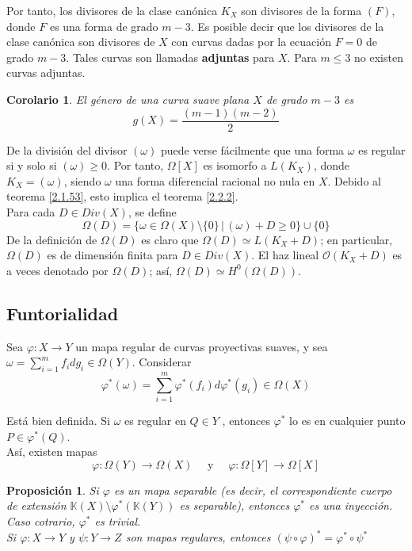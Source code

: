 \documentclass[12pt,a4paper]{report}
\newcommand{\Ou}{\mathscr{O}}
\newcommand{\K}{\mathbb{K}}
\newcommand{\ds}{\displaystyle}
\newtheorem{cor}{Corolario}[chapter]
\newtheorem{prop}{Proposición}[chapter]
\begin{document}
Por tanto, los divisores de la clase canónica $K_{X}$ son divisores de la forma $(F)$, donde $F$ es una forma de grado $m-3$. Es posible decir que los divisores de la clase canónica son divisores de $X$ con curvas dadas por la ecuación $F=0$ de grado $m-3$. Tales curvas son llamadas \textbf{adjuntas} para $X$. Para $m \leq 3$ no existen curvas adjuntas.

\begin{cor}
	El género de una curva suave plana $X$ de grado $m-3$ es $$g(X) = \frac{(m-1)(m-2)}{2}$$
\end{cor}

De la división del divisor $(\omega )$ puede verse fácilmente que una forma $\omega $ es regular si y solo si $(\omega) \geqslant 0$. Por tanto, $\Omega [X]$ es isomorfo a $L (K_{X})$, donde $K_{X}=(\omega)$, siendo $\omega$ una forma diferencial racional no nula en $X$. Debido al teorema \ref{2.1.53}, esto implica el teorema \ref{2.2.2}. \\

Para cada $D \in Div(X)$, se define $$\Omega (D)= \{ \omega \in \Omega (X) \setminus \{0 \} \, | \, (\omega) +D \geqslant 0\} \cup \{0\} $$ 
De la definición de $\Omega (D)$ es claro que $\Omega(D)\simeq L(K_{X}+D) $; en particular, $\Omega (D)$ es de dimensión finita para $D \in Div (X)$. El haz lineal $\Ou(K_{X}+D)$ es a veces denotado por $\Omega(D)$; así, $\Omega (D)  \simeq H^{0}(\Omega (D))$.


\subsection{Funtorialidad}
Sea $\varphi:X \rightarrow Y$ un mapa regular de curvas proyectivas suaves, y sea $\omega = \ds \sum_{i=1}^{m}f_{i}dg_{i}\in \Omega(Y)$. Considerar $$\varphi^{*}(\omega) = \sum_{i=1}^{m}\varphi^{*}(f_{i})d\varphi^{*}(g_{i})\in \Omega(X)$$

Está bien definida. Si $\omega$ es regular en $Q\in Y$ , entonces $\varphi^{*}$ lo es en cualquier punto $P \in \varphi^{*}(Q)$.\\

Así, existen mapas $$\varphi : \Omega (Y) \rightarrow \Omega(X) \quad \mbox{ y } \quad \varphi : \Omega [Y] \rightarrow \Omega[X]  $$

\begin{prop}
	Si $\varphi$ es un mapa separable (es decir, el correspondiente cuerpo de extensión $\K(X)\setminus \varphi^{*} (\K(Y)) $ es separable), entonces $\varphi^{*}$ es una inyección. Caso cotrario, $\varphi^{*}$ es trivial.\\
	Si $\varphi: X \rightarrow Y$ y $\psi : Y \rightarrow Z$ son mapas regulares, entonces $(\psi \circ \varphi)^{*}= \varphi^{*} \circ \psi ^{*}$
\end{prop}
\end{document}
